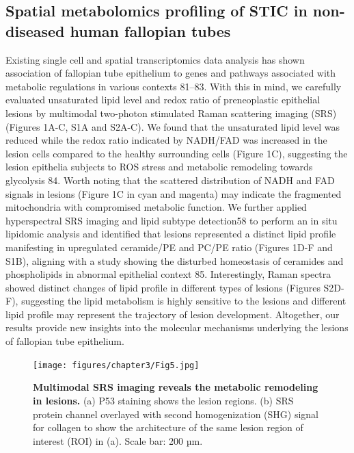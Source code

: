 \begin{refsection}
    \subsection{Spatial metabolomics profiling of STIC in non-diseased human fallopian tubes}
    Existing single cell and spatial transcriptomics data analysis has shown association of fallopian tube epithelium to genes and pathways associated with metabolic regulations in various contexts 81–83. With this in mind, we carefully evaluated unsaturated lipid level and redox ratio of preneoplastic epithelial lesions by multimodal two-photon stimulated Raman scattering imaging (SRS) (Figures 1A-C, S1A and S2A-C). We found that the unsaturated lipid level was reduced while the redox ratio indicated by NADH/FAD was increased in the lesion cells compared to the healthy surrounding cells (Figure 1C), suggesting the lesion epithelia subjects to ROS stress and metabolic remodeling towards glycolysis 84. Worth noting that the scattered distribution of NADH and FAD signals in lesions (Figure 1C in cyan and magenta) may indicate the fragmented mitochondria with compromised metabolic function.  We further applied hyperspectral SRS imaging and lipid subtype detection58 to perform an in situ lipidomic analysis and identified that lesions represented a distinct lipid profile manifesting in upregulated ceramide/PE and PC/PE ratio (Figures 1D-F and S1B), aligning with a study showing the disturbed homeostasis of ceramides and phospholipids in abnormal epithelial context 85. 
    Interestingly, Raman spectra showed distinct changes of lipid profile in different types of lesions (Figures S2D-F), suggesting the lipid metabolism is highly sensitive to the lesions and different lipid profile may represent the trajectory of lesion development. Altogether, our results provide new insights into the molecular mechanisms underlying the lesions of fallopian tube epithelium.


    \begin{figure}[p]
        \begin{center}
            \texttt{[image: figures/chapter3/Fig5.jpg]}
            \captionsetup{font=small}
            \caption{ \textbf{Multimodal SRS imaging reveals the metabolic remodeling in lesions.} (a) P53 staining shows the lesion regions. (b) SRS protein channel overlayed with second homogenization (SHG) signal for collagen to show the architecture of the same lesion region of interest (ROI) in (a). Scale bar: 200 µm.}
            \label{chapter3_fig5}
        \end{center}
    \end{figure}
    

\end{refsection}
